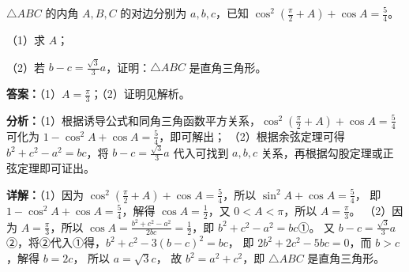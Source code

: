 \begin{question}[points=12]
$\triangle ABC$ 的内角 $A,B,C$ 的对边分别为 $a,b,c$，已知 $\cos^2\left(\frac{\pi}{2}+A\right)+\cos A=\frac{5}{4}$。

（1）求 $A$；

（2）若 $b-c=\frac{\sqrt{3}}{3}a$，证明：$\triangle ABC$ 是直角三角形。
\begin{solution}
\textbf{答案：}（1）$A=\frac{\pi}{3}$；（2）证明见解析。

\textbf{分析：}（1）根据诱导公式和同角三角函数平方关系，$\cos^2\left(\frac{\pi}{2}+A\right)+\cos A=\frac{5}{4}$ 可化为 $1-\cos^2 A+\cos A=\frac{5}{4}$，即可解出；
（2）根据余弦定理可得 $b^2+c^2-a^2=bc$，将 $b-c=\frac{\sqrt{3}}{3}a$ 代入可找到 $a,b,c$ 关系，再根据勾股定理或正弦定理即可证出。

\textbf{详解：}（1）因为 $\cos^2\left(\frac{\pi}{2}+A\right)+\cos A=\frac{5}{4}$，所以 $\sin^2 A+\cos A=\frac{5}{4}$，
即 $1-\cos^2 A+\cos A=\frac{5}{4}$，解得 $\cos A=\frac{1}{2}$，又 $0<A<\pi$，所以 $A=\frac{\pi}{3}$。
（2）因为 $A=\frac{\pi}{3}$，所以 $\cos A=\frac{b^2+c^2-a^2}{2bc}=\frac{1}{2}$，即 $b^2+c^2-a^2=bc$①。
又 $b-c=\frac{\sqrt{3}}{3}a$②，将②代入①得，$b^2+c^2-3(b-c)^2=bc$，
即 $2b^2+2c^2-5bc=0$，而 $b>c$，解得 $b=2c$，
所以 $a=\sqrt{3}c$，
故 $b^2=a^2+c^2$，即 $\triangle ABC$ 是直角三角形。
\end{solution}
\end{question}

